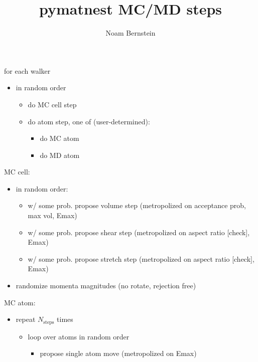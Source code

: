 \documentclass{article}
\title{pymatnest MC/MD steps}
\author{Noam Bernstein}
\begin{document}
\maketitle

for each walker
\begin{itemize}
   \item in random order
      \begin{itemize}
	 \item do MC cell step
	 \item do atom step, one of (user-determined):
	 \begin{itemize}
	    \item do MC atom
	    \item do MD atom
	 \end{itemize}
      \end{itemize}
\end{itemize}

\vspace*{\baselineskip}
MC cell:
\begin{itemize}
   \item in random order:
   \begin{itemize}
      \item w/ some prob. propose volume step (metropolized on acceptance prob, max vol, Emax)
      \item w/ some prob. propose shear step (metropolized on aspect ratio [check], Emax)
      \item w/ some prob. propose stretch step (metropolized on aspect ratio [check], Emax)
   \end{itemize}
   \item randomize momenta magnitudes (no rotate, rejection free)
\end{itemize}

\vspace*{\baselineskip}
MC atom:
\begin{itemize}
   \item repeat $N_\mathrm{steps}$ times
   \begin{itemize}
      \item loop over atoms in random order
      \begin{itemize}
	 \item propose single atom move (metropolized on Emax)
      \end{itemize}
   \end{itemize}
\end{itemize}
\end{document}
